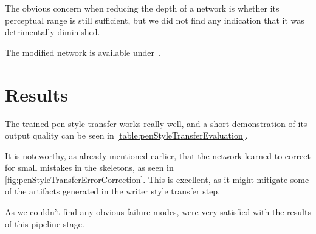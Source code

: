 The obvious concern when reducing the depth of a network is whether its perceptual range is still sufficient, but we did not find any indication that it was detrimentally diminished.

The modified network is available under~\cite{pix2pixFixed}.

\section{Results}


The trained pen style transfer works really well, and a short demonstration of its output quality can be seen in \cref{table:penStyleTransferEvaluation}.

It is noteworthy, as already mentioned earlier, that the network learned to correct for small mistakes in the skeletons, as seen in \cref{fig:penStyleTransferErrorCorrection}. This is excellent, as it might mitigate some of the artifacts generated in the writer style transfer step.

As we couldn't find any obvious failure modes, were very satisfied with the results of this pipeline stage.


